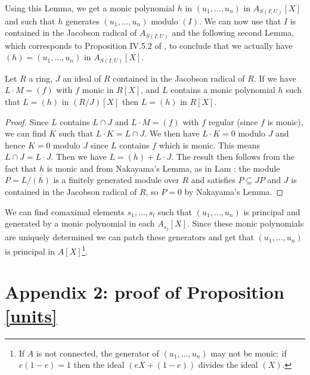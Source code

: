  Using this Lemma, we get a monic polynomial $h$ in $(u_1,\dots,u_n)$ in $A_{S(I;U)}[X]$
 and such that $h$ generates $(u_1,\dots,u_n)$ modulo $(I)$.
 We can now use that $I$ is contained in the Jacobson radical of $A_{S(I;U)}$ and the
 following second Lemma, which corresponds to Proposition IV.5.2 of \cite{Lam},
 to conclude that we actually have $(h) = (u_1,\dots,u_n)$ in $A_{S(I;U)}[X]$.

\begin{lemma}
  Let $R$ a ring, $J$ an ideal of $R$ contained in the Jacobson radical of $R$. If
  we have $L\cdot M = (f)$ with $f$ monic in $R[X]$, and $L$ contains a monic polynomial
  $h$ such that $L = (h)$ in $(R/J)[X]$ then $L = (h)$ in $R[X]$.
\end{lemma}

\begin{proof}
  Since $L$ contains $L\cap J$ and $L\cdot M = (f)$ with $f$ regular (since $f$ is monic),
  we can find $K$   such that $L\cdot K = L\cap J$.
  We then have $L\cdot K = 0$ modulo $J$ and hence $K = 0$ modulo $J$ since $L$ contains $f$
  which is monic.
  This means $L\cap J = L\cdot J$. Then we have $L = (h) + L\cdot J$.
  The result then follows from the fact that $h$ is monic and from Nakayama's Lemma, as in Lam \cite{Lam}:
  the module $P = L/(h)$ is a finitely generated module over $R$ and satisfies
  $P\subseteq JP$ and $J$ is contained in the Jacobson radical of $R$, so $P = 0$ by Nakayama's Lemma.
\end{proof}

\begin{corollary}
  We can find comaximal elements $s_1,\dots,s_l$ such that $(u_1,\dots,u_n)$ is principal and generated by a
  monic polynomial in each $A_{s_j}[X]$. Since these monic polynomials are uniquely determined
  we can patch these generators and get that $(u_1,\dots,u_n)$ is principal in $A[X]$\footnote{If $A$ is not
  connected, the generator of $(u_1,\dots,u_n)$ may not be monic: if $e(1-e)=1$ then the ideal $(eX+(1-e))$
  divides the ideal $(X)$.}.
\end{corollary}

\newpage

\section*{Appendix 2: proof of Proposition \ref{units}}

